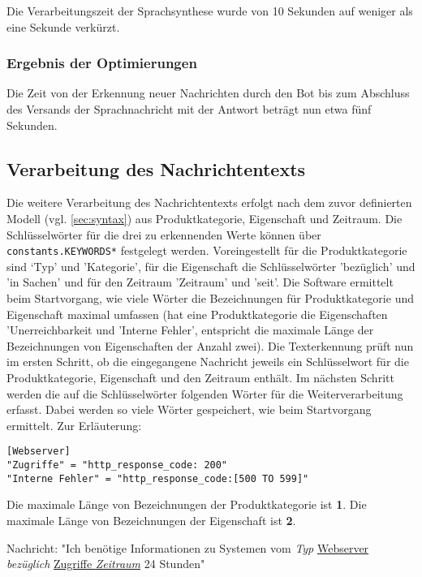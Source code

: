 Die Verarbeitungszeit der Sprachsynthese wurde von 10 Sekunden auf weniger als eine Sekunde verkürzt.

\subsubsection{Ergebnis der Optimierungen}

Die Zeit von der Erkennung neuer Nachrichten durch den Bot bis zum Abschluss des Versands der Sprachnachricht mit der Antwort beträgt nun etwa fünf Sekunden.

\subsection{Verarbeitung des Nachrichtentexts}

Die weitere Verarbeitung des Nachrichtentexts erfolgt nach dem zuvor definierten Modell (vgl. \autoref{sec:syntax}) aus Produktkategorie, Eigenschaft und Zeitraum. Die Schlüsselwörter für die drei zu erkennenden Werte können über \lstinline{constants.KEYWORDS*} festgelegt werden. Voreingestellt für die Produktkategorie sind ‘Typ' und 'Kategorie', für die Eigenschaft die Schlüsselwörter 'bezüglich' und 'in Sachen' und für den Zeitraum 'Zeitraum' und 'seit'. Die Software ermittelt beim Startvorgang, wie viele Wörter die Bezeichnungen für Produktkategorie und Eigenschaft maximal umfassen (hat eine Produktkategorie die Eigenschaften 'Unerreichbarkeit und 'Interne Fehler', entspricht die maximale Länge der Bezeichnungen von Eigenschaften der Anzahl zwei). Die Texterkennung prüft nun im ersten Schritt, ob die eingegangene Nachricht jeweils ein Schlüsselwort für die Produktkategorie, Eigenschaft und den Zeitraum enthält. Im nächsten Schritt werden die auf die Schlüsselwörter folgenden Wörter für die Weiterverarbeitung erfasst. Dabei werden so viele Wörter gespeichert, wie beim Startvorgang ermittelt. Zur Erläuterung:

\begin{lstlisting}[caption={Auszug aus der Datei config.toml}, label=config-toml, xleftmargin=6mm]
[Webserver]
"Zugriffe" = "http_response_code: 200"
"Interne Fehler" = "http_response_code:[500 TO 599]"
\end{lstlisting}

Die maximale Länge von Bezeichnungen der Produktkategorie ist \textbf{1}. Die maximale Länge von Bezeichnungen der Eigenschaft ist \textbf{2}.

Nachricht: "Ich benötige Informationen zu Systemen vom \textit{Typ} \underline{Webserver} \textit{bezüglich} \underline{Zugriffe \textit{Zeitraum}} 24 Stunden"

